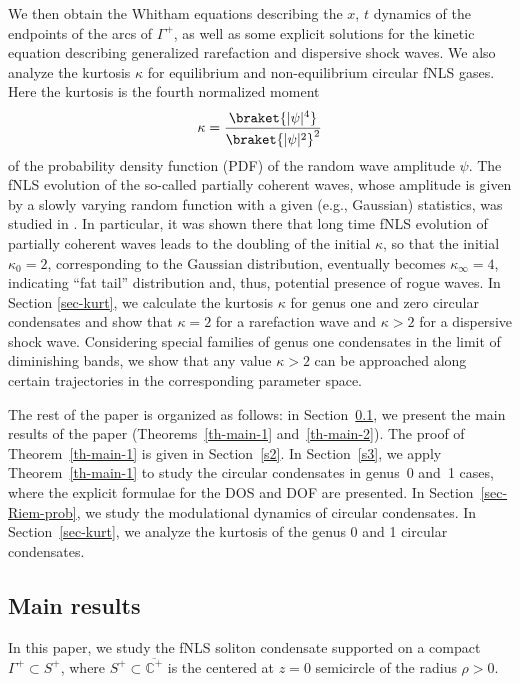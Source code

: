 \documentclass[pdftex]{sigma}
\numberwithin{equation}{section}
\newcommand{\G}{\Gamma}
\def\C{{\mathbb C}}
\def\G{\Gamma}
\begin{document}
We then obtain the Whitham equations describing the $x$, $t$ dynamics of the endpoints of the arcs of $\G^+$,
as well as some explicit solutions for
the kinetic equation describing generalized rarefaction and dispersive shock waves.
We also analyze the kurtosis $\kappa$
for equilibrium and non-equilibrium circular fNLS gases.
Here the kurtosis is the fourth
normalized moment
\begin{align*}
\kappa=\frac{\braket{|\psi|^4}}{\braket{|\psi|^2}^2}
\end{align*}
of the probability density function (PDF) of the random wave amplitude $\psi$.
The fNLS evolution of
the so-called partially coherent waves, whose amplitude is
given by a slowly varying random function with a given
(e.g., Gaussian) statistics, was studied in \cite{CERTRS}. In particular, it was shown there that long time fNLS evolution of partially coherent waves leads to the doubling of the initial $	\kappa$, so that the initial $	\kappa_0=2$, corresponding to the Gaussian distribution, eventually becomes $	\kappa_\infty=4$, indicating ``fat tail'' distribution and, thus, potential presence of rogue waves. In Section \ref{sec-kurt}, we calculate the kurtosis $\kappa$ for genus one and zero circular condensates and show that $\kappa=2$ for a rarefaction wave and $\kappa>2$ for a dispersive shock wave.
Considering special families of genus one condensates in the limit of diminishing bands, we show that
any value $\kappa>2$ can be approached along certain trajectories in the corresponding parameter space.

The rest of the paper is organized as follows: in Section~\ref{sec-Main}, we present the main results of the paper (Theorems~\ref{th-main-1} and~\ref{th-main-2}). The proof of Theorem~\ref{th-main-1} is given in Section~\ref{s2}. In Section~\ref{s3}, we apply Theorem~\ref{th-main-1} to study the circular condensates in genus~0 and~1 cases, where the explicit formulae for the DOS and DOF are presented. In Section~\ref{sec-Riem-prob}, we study the modulational dynamics of circular condensates.
In Section~\ref{sec-kurt}, we analyze the kurtosis of the genus 0 and 1 circular condensates.

\subsection{Main results}
\label{sec-Main}

In this paper, we study the fNLS soliton condensate supported on a compact $\G^+\subset S^+$, where $S^+\subset \overline{\C^+}$ is the centered at $z=0$ semicircle of the radius $\rho>0$.
\end{document}
